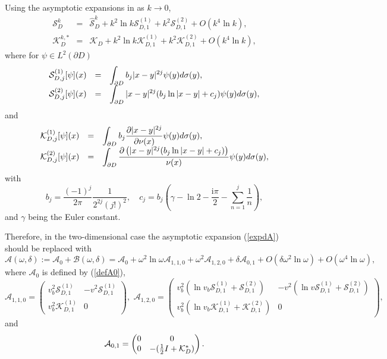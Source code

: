 \documentclass[11pt]{article}
\numberwithin{equation}{section}
\newcommand{\ds}{\displaystyle}
\def\ri{{\mathrm{i}}}
\newcommand\1{{\ensuremath {\mathds 1} }}
\begin{document}
{{Using the asymptotic expansions in \cite[Appendix A]{H3a} as $k\rightarrow 0$, 
$$
\begin{array}{lll}
\mathcal{S}_{D}^{k}&=&  \hat{\mathcal{S}}_{D}^k +k^{2}\ln k \mathcal{S}_{D, 1}^{(1)}+k^{2} \mathcal{S}_{D, 1}^{(2)} + O(k^4 \ln k),\\
\mathcal{K}_{D}^{k,*}&=& \mathcal{K}_{D} +k^{2}\ln k \mathcal{K}_{D, 1}^{(1)}+k^{2} \mathcal{K}_{D, 1}^{(2)} + O(k^4 \ln k),
\end{array}
$$
where for $\psi\in L^2(\partial D)$
$$\begin{array}{lll}
\mathcal{S}_{D, j}^{(1)} [\psi](x) &=& \ds \int_{\p D} b_j|x-y|^{2j} \psi(y)d\sigma(y),\\
\mathcal{S}_{D, j}^{(2)} [\psi](x) &=& \ds \int_{\p D} |x-y|^{2j}(b_j\ln|x-y|+c_j)\psi(y)d\sigma(y),
\end{array}$$
and 
$$\begin{array}{lll}
\mathcal{K}_{D, j}^{(1)} [\psi](x) &=& \ds \int_{\p D} b_j\dfrac{\partial |x-y|^{2j}}{\partial \nu(x)}\psi(y)d\sigma(y),\\
\mathcal{K}_{D, j}^{(2)} [\psi](x) &=& \ds \int_{\p D} \dfrac{\partial \left( |x-y|^{2j}(b_j\ln|x-y|+c_j)\right)}{\nu(x)}\psi(y)d\sigma(y),
\end{array}$$
with 
$$
b_j = \dfrac{(-1)^j}{2\pi}\dfrac{1}{2^{2j}(j!)^2}, \quad c_j = b_j\left(\gamma -\ln 2-\dfrac{\ri \pi}{2}-\sum_{n=1}^j\dfrac{1}{n}\right),
$$
and
$\gamma$ being the Euler constant.


Therefore, in the two-dimensional case the asymptotic expansion (\ref{expdA}) should be replaced with 
\[
\mathcal{A}(\omega, \delta):=\mathcal{A}_0 + \mathcal{B}(\omega, \delta)
= \mathcal{A}_0 + \omega^2 \ln \omega \mathcal{A}_{1,1, 0}+ \omega^2 \mathcal{A}_{1, 2, 0}
+ \delta \mathcal{A}_{0, 1}+ O(\delta \omega^2 \ln \omega)  + O(\omega^4 \ln \omega),
\]
where $\mathcal{A}_0$ is defined by (\ref{defA0}), 
\[
\mathcal{A}_{1, 1,0}= 
\begin{pmatrix}
  v_b^2\mathcal{S}_{D,1}^{(1)} &  -v^2\mathcal{S}_{D,1}^{(1)}  \\
  v_b^2\mathcal{K}_{D,1}^{(1)}& 0
\end{pmatrix},
\,\, 
\mathcal{A}_{1, 2,0}= 
\begin{pmatrix}
  v_b^2\left( \ln v_b \mathcal{S}_{D,1}^{(1)} + \mathcal{S}_{D,1}^{(2)}\right) &  -  v^2\left( \ln v \mathcal{S}_{D,1}^{(1)} + \mathcal{S}_{D,1}^{(2)}\right)  \\
   v_b^2\left( \ln v_b \mathcal{K}_{D,1}^{(1)} + \mathcal{K}_{D,1}^{(2)}\right)& 0
\end{pmatrix},
\]
and 
\[
\mathcal{A}_{0, 1}=
\begin{pmatrix}
0& 0\\
0 &  -(\frac{1}{2}I + \mathcal{K}_{D}^*)
\end{pmatrix}.
\]

}}
\end{document}
